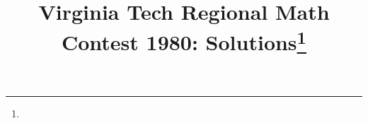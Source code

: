 \documentclass[10pt]{article}
\begin{document}
\title{Virginia Tech Regional Math Contest 1980: Solutions\footnote{\disclaimer}}
\author{\vspace{-2ex}}
\date{\vspace{-5ex}} %
\maketitle







%

%

%

%

%

%
\end{document}
